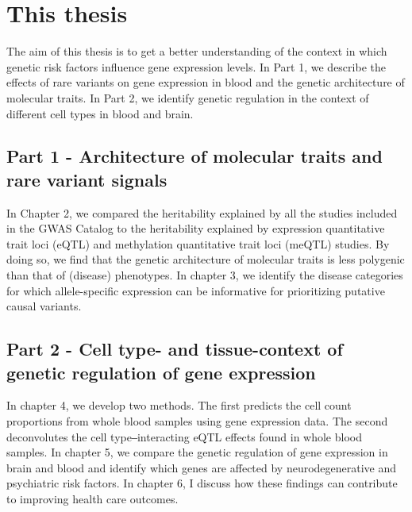 

\section{This thesis}

The aim of this thesis is to get a better understanding of the context in which genetic risk factors influence gene expression levels. In Part 1, we describe the effects of rare variants on gene expression in blood and the genetic architecture of molecular traits. In Part 2, we identify genetic regulation in the context of different cell types in blood and brain.


\subsection{Part 1 - Architecture of molecular traits and rare variant signals}

In Chapter 2, we compared the heritability explained by all the studies included in the GWAS Catalog\cite{bunielloNHGRIEBIGWASCatalog2019} to the heritability explained by expression quantitative trait loci (eQTL) and methylation quantitative trait loci (meQTL) studies. By doing so, we find that the genetic architecture of molecular traits is less polygenic than that of (disease) phenotypes. In chapter 3, we identify the disease categories for which allele-specific expression can be informative for prioritizing putative causal variants.


\subsection{Part 2 - Cell type- and tissue-context of genetic regulation of gene expression}

In chapter 4, we develop two methods. The first predicts the cell count proportions from whole blood samples using gene expression data. The second deconvolutes the cell type‒interacting eQTL effects found in whole blood samples. In chapter 5, we compare the genetic regulation of gene expression in brain and blood and identify which genes are affected by neurodegenerative and psychiatric risk factors. In chapter 6, I discuss how these findings can contribute to improving health care outcomes.











